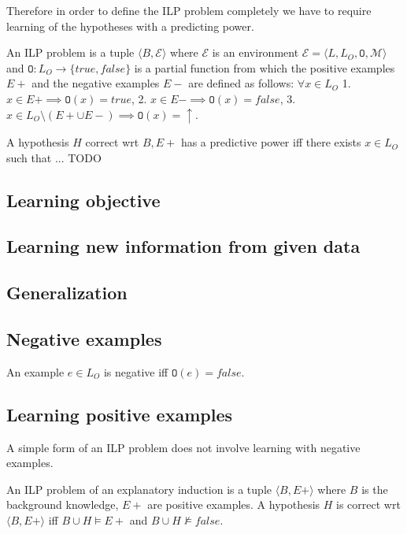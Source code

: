 Therefore in order to define the ILP problem completely we have to require learning of the hypotheses with a predicting power.

\begin{defn}
An ILP problem is a tuple $\langle B, \mathcal{E} \rangle$ where
$\mathcal{E}$ is an environment
$\mathcal{E}=\langle L, L_O, \mathtt{O}, \mathcal{M} \rangle$
and 
$\mathtt{O}:L_O \to \{true, false\}$ is a partial function from which the positive examples $E+$ and the negative examples $E-$ are defined as follows:
$\forall x \in L_O$
1. $x \in E+ \implies \mathtt{O}(x)=true$,
2. $x \in E- \implies \mathtt{O}(x)=false$,
3. $x \in L_O \setminus (E+ \cup E-) \implies \mathtt{O}(x)=\uparrow$.


A hypothesis $H$ correct wrt $B, E+$ has a predictive power iff
there exists $x \in L_O$ such that ... TODO


\end{defn}

\subsection{Learning objective}
\subsection{Learning new information from given data}
\subsection{Generalization}
\subsection{Negative examples}
An example $e \in L_O$ is negative iff $\mathtt{O}(e)=false$.
\subsection{Learning positive examples}
A simple form of an ILP problem does not involve learning with negative examples.
\begin{defn}
An ILP problem of an explanatory induction\cite{yamamoto2012inverse} is a tuple $\langle B, E+ \rangle$ where $B$ is the background knowledge, $E+$ are positive examples. A hypothesis $H$ is correct wrt $\langle B, E+\rangle$ iff
$B \cup H \models E+$ and $B \cup H \not\models false$.
\end{defn}
